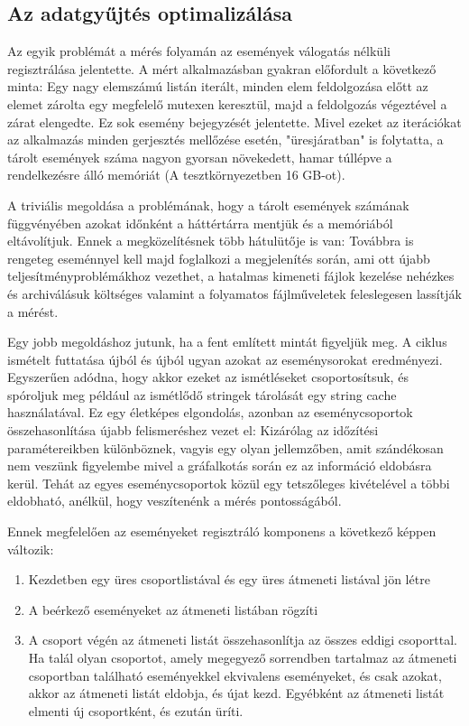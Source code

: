     \subsection{Az adatgyűjtés optimalizálása}
    
Az egyik problémát a mérés folyamán az események válogatás nélküli regisztrálása jelentette. A mért alkalmazásban gyakran előfordult a következő minta: Egy nagy elemszámú listán iterált, minden elem feldolgozása előtt az elemet zárolta egy megfelelő mutexen keresztül, majd a feldolgozás végeztével a zárat elengedte. Ez sok esemény bejegyzését jelentette. Mivel ezeket az iterációkat az alkalmazás minden gerjesztés mellőzése esetén, "üresjáratban" is folytatta, a tárolt események száma nagyon gyorsan növekedett, hamar túllépve a rendelkezésre álló memóriát (A tesztkörnyezetben 16 GB-ot).

    A triviális megoldása a problémának, hogy a tárolt események számának függvényében azokat időnként a háttértárra mentjük és a memóriából eltávolítjuk. Ennek a megközelítésnek több hátulütője is van: Továbbra is rengeteg eseménnyel kell majd foglalkozi a megjelenítés során, ami ott újabb teljesítményproblémákhoz vezethet, a hatalmas kimeneti fájlok kezelése nehézkes és archiválásuk költséges valamint a folyamatos fájlműveletek feleslegesen lassítják a mérést.
    
    Egy jobb megoldáshoz jutunk, ha a fent említett mintát figyeljük meg. A ciklus ismételt futtatása újból és újból ugyan azokat az eseménysorokat eredményezi. Egyszerűen adódna, hogy akkor ezeket az ismétléseket csoportosítsuk, és spóroljuk meg például az ismétlődő stringek tárolását egy string cache használatával. Ez egy életképes elgondolás, azonban az eseménycsoportok összehasonlítása újabb felismeréshez vezet el: Kizárólag az időzítési paramétereikben különböznek, vagyis egy olyan jellemzőben, amit szándékosan nem veszünk figyelembe mivel a gráfalkotás során ez az információ eldobásra kerül. Tehát az egyes eseménycsoportok közül egy tetszőleges kivételével a többi eldobható, anélkül, hogy veszítenénk a mérés pontosságából.
    
    Ennek megfelelően az eseményeket regisztráló komponens a következő képpen változik:
    
    \begin{enumerate}
        \item Kezdetben egy üres csoportlistával és egy üres átmeneti listával jön létre
        \item A beérkező eseményeket az átmeneti listában rögzíti
        \item A csoport végén az átmeneti listát összehasonlítja az összes eddigi csoporttal. Ha talál olyan csoportot, amely megegyező sorrendben tartalmaz az átmeneti csoportban található eseményekkel ekvivalens eseményeket, és csak azokat, akkor az átmeneti listát eldobja, és újat kezd. Egyébként az átmeneti listát elmenti új csoportként, és ezután üríti.
    \end{enumerate}
    
